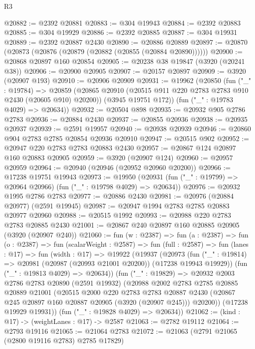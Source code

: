 \begin{lexlean}{R3}
\begin{coremodule}
@20882 := @2392 @20881
@20883 := @304 @19943
@20884 := @2392 @20883
@20885 := @304 @19929
@20886 := @2392 @20885
@20887 := @304 @19931
@20889 := @2392 @20887 @2430
@20890 := @20886 @20889
@20897 := @20870 (@20873 (@20876 (@20879 (@20882 (@20855 (@20884 @20890))))))
@20900 := @20868 @20897 @160 @20854
@20905 := @20238 @38 @19847 (@3920 (@20241 @38))
@20906 := @20900 @20905
@20907 := @20157 @20897
@20909 := @3920 (@20907 @193)
@20910 := @20906 @20909
@20931 := @19962
    (@20850
      (fun ("_" : @19784) =>
      @20859
        (@20865 @20910 (@20515 @911 @220 @2783 @2783 @910 @2430 (@20605 @910) @20200))
        (@3945 @19751 @172))
      (fun ("_" : @19783 @4029) => @20634))
@20932 := @20504 @898
@20935 := @20932 @905 @2786 @2783
@20936 := @20884 @2430
@20937 := @20855 @20936
@20938 := @20935 @20937
@20939 := @2591 @19957
@20940 := @20938 @20939
@20946 := @20860 @904 @2783 @2785 @20854 @20936 @20910
@20947 := @20515 @902
@20952 := @20947 @220 @2783 @2783 @20883 @2430
@20957 := @20867 @124 @20897 @160 @20883 @20905
@20959 := @3920 (@20907 @124)
@20960 := @20957 @20959
@20964 := @20940 (@20946 (@20952 @20960 @20200))
@20966 := @17238 @19751 @19943
@20973 := @19950 (@20931 (fun ("_" : @19799) => @20964 @20966) (fun ("_" : @19798 @4029) => @20634))
@20976 := @20932 @1995 @2786 @2783
@20977 := @20886 @2430
@20981 := @20976 (@20884 @20977) (@2591 @19945)
@20987 := @20947 @1994 @2783 @2785 @20883 @20977 @20960
@20988 := @20515 @1992
@20993 := @20988 @220 @2783 @2783 @20885 @2430
@21001 := @20867 @240 @20897 @160 @20885 @20905 (@3920 (@20907 @240))
@21060 := fun (w : @2387) =>
  fun (a : @2387) =>
  fun (o : @2387) =>
  fun (scalarWeight : @2587) =>
  fun (full : @2587) =>
  fun (lanes : @17) =>
  fun (width : @17) =>
  @19922
    (@19937
      (@20973
        (fun ("_" : @19814) => @20981 (@20987 (@20993 @21001 @20200)) (@17238 @19943 @19929))
        (fun ("_" : @19813 @4029) => @20634))
      (fun ("_" : @19829) =>
      @20932
        @2003
        @2786
        @2783
        @20890
        (@2591 @19932)
        (@20988
          @2002
          @2783
          @2785
          @20885
          @20889
          @21001
          (@20515
            @2000
            @220
            @2783
            @2783
            @20887
            @2430
            (@20867 @245 @20897 @160 @20887 @20905 (@3920 (@20907 @245)))
            @20200))
        (@17238 @19929 @19931))
      (fun ("_" : @19828 @4029) => @20634))
@21062 := (kind : @17) -> (weightLanes : @17) -> @2587
@21063 := @2782 @19112
@21064 := @2793 @19116
@21065 := @21064 @2783
@21072 := @21063 (@2791 @21065 (@2800 @19116 @2783) @2785 @17829)

\end{coremodule}
\end{lexlean}
